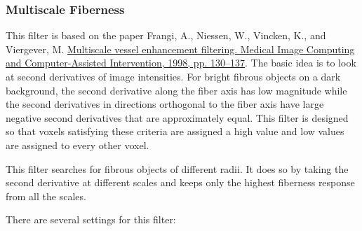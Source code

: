 \documentclass[11pt,titlepage,twoside]{article}
\begin{document}
\subsubsection{Multiscale Fiberness}

This filter is based on the paper Frangi, A., Niessen, W., Vincken, K., and Viergever, M.
\href{http://www.springerlink.com/content/a57784628587870p/}{Multiscale vessel enhancement filtering. Medical Image Computing and Computer-Assisted Intervention, 1998, pp. 130--137}. The basic idea is to look at second derivatives of image intensities. For bright fibrous objects on a dark background, the second derivative along the fiber axis has low magnitude while the second derivatives in directions orthogonal to the fiber axis have large negative second derivatives that
are approximately equal. This filter is designed so that voxels satisfying these criteria are assigned a high value and low values are assigned to every other voxel.

This filter searches for fibrous objects of different radii. It does so by taking the second derivative at different scales and keeps only the highest fiberness response from all the scales.

There are several settings for this filter:
\end{document}
